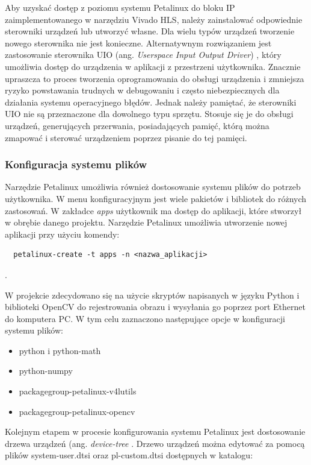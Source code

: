 Aby uzyskać dostęp z poziomu systemu Petalinux do bloku IP zaimplementowanego w narzędziu Vivado HLS, należy 
zainstalować odpowiednie sterowniki urządzeń lub utworzyć własne. Dla wielu typów urządzeń tworzenie nowego sterownika 
nie jest konieczne. Alternatywnym rozwiązaniem jest zastosowanie sterownika UIO (ang. \emph{Userspace Input Output 
Driver}) \cite{uio-drivers}, który umożliwia dostęp do urządzenia w aplikacji z przestrzeni użytkownika. Znacznie 
upraszcza to proces tworzenia oprogramowania do obsługi urządzenia i zmniejsza ryzyko powstawania trudnych w 
debugowaniu i często niebezpiecznych dla działania systemu operacyjnego błędów. Jednak należy pamiętać, że sterowniki 
UIO nie są przeznaczone dla dowolnego typu sprzętu. Stosuje się je do obsługi urządzeń, generujących przerwania, 
posiadających pamięć, którą można zmapować i sterować urządzeniem poprzez pisanie do tej pamięci. 

\subsubsection{Konfiguracja systemu plików}

Narzędzie Petalinux umożliwia również dostosowanie systemu plików do potrzeb użytkownika. W menu konfiguracyjnym jest 
wiele pakietów i bibliotek do różnych zastosowań. W zakładce \emph{apps} użytkownik ma dostęp do aplikacji, które 
stworzył w obrębie danego projektu. Narzędzie Petalinux umożliwia utworzenie nowej aplikacji przy użyciu komendy:
\begin{verbatim}
  petalinux-create -t apps -n <nazwa_aplikacji>
\end{verbatim}.

W projekcie zdecydowano się na użycie skryptów napisanych w języku Python i biblioteki OpenCV do rejestrowania obrazu i 
wysyłania go poprzez port Ethernet do komputera PC. W tym celu zaznaczono następujące opcje w konfiguracji systemu 
plików:  

\begin{itemize}
  \item python i python-math
  \item python-numpy
  \item packagegroup-petalinux-v4lutils 
  \item packagegroup-petalinux-opencv
\end{itemize}


Kolejnym etapem w procesie konfigurowania systemu Petalinux jest dostosowanie drzewa urządzeń (ang. \emph{device-tree}
. Drzewo urządzeń można edytować za pomocą plików system-user.dtsi oraz pl-custom.dtsi dostępnych w katalogu:

